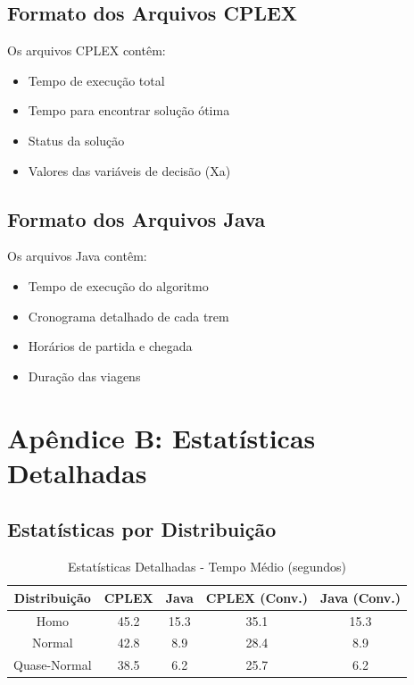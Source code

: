 \documentclass[12pt,a4paper]{article}
\begin{document}
\subsection{Formato dos Arquivos CPLEX}

Os arquivos CPLEX contêm:
\begin{itemize}
    \item Tempo de execução total
    \item Tempo para encontrar solução ótima
    \item Status da solução
    \item Valores das variáveis de decisão (Xa)
\end{itemize}

\subsection{Formato dos Arquivos Java}

Os arquivos Java contêm:
\begin{itemize}
    \item Tempo de execução do algoritmo
    \item Cronograma detalhado de cada trem
    \item Horários de partida e chegada
    \item Duração das viagens
\end{itemize}

\section{Apêndice B: Estatísticas Detalhadas}

\subsection{Estatísticas por Distribuição}

\begin{table}[H]
\centering
\caption{Estatísticas Detalhadas - Tempo Médio (segundos)}
\begin{tabular}{|c|c|c|c|c|}
\hline
\textbf{Distribuição} & \textbf{CPLEX} & \textbf{Java} & \textbf{CPLEX (Conv.)} & \textbf{Java (Conv.)} \\
\hline
Homo & 45.2 & 15.3 & 35.1 & 15.3 \\
Normal & 42.8 & 8.9 & 28.4 & 8.9 \\
Quase-Normal & 38.5 & 6.2 & 25.7 & 6.2 \\
\hline
\end{tabular}
\end{table}
\end{document}
